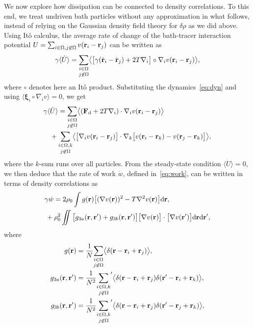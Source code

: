 \documentclass[pre, superscriptaddress, twocolumn,pre]{revtex4-1}
\newcommand{\dd}{\text{d}}
\begin{document}
We now explore how dissipation can be connected to density correlations. To this end, we treat undriven bath particles without any approximation in what follows, instead of relying on the Gaussian density field theory for $\delta\rho$ as we did above. Using It\^o calculus, the average rate of change of the bath-tracer interaction potential $U = \sum_{i\in\Omega,j\not\in\Omega} v({\bf r}_i-{\bf r}_j)$ can be written as
\begin{equation}
	\gamma\langle\dot U \rangle = \underset{j\not\in\Omega}{\sum_{i\in\Omega}} \big\langle\big[\gamma(\dot{\bf r}_i - \dot{\bf r}_j) + 2 T \nabla_i\big] \circ \nabla_i v({\bf r}_i-{\bf r}_j)\big\rangle ,
\end{equation}
where $\circ$ denotes here an It\^o product. Substituting the dynamics~\eqref{eq:dyn} and using $\langle{\boldsymbol\xi}_i\circ\nabla_i v\rangle=0$, we get
\begin{equation}\label{eq:dotU}
	\begin{aligned}
		\gamma\langle&\dot U \rangle = \underset{j\not\in\Omega}{\sum_{i\in\Omega}} \big\langle({\bf F}_{\rm d} + 2 T \nabla_i) \cdot \nabla_i v({\bf r}_i-{\bf r}_j)\big\rangle
		\\
		& + \underset{j\not\in\Omega}{\sum_{i\in\Omega,k}} \big\langle \big[\nabla_i v({\bf r}_i-{\bf r}_j)\big]\cdot \nabla_k \big[ v({\bf r}_i-{\bf r}_k) - v({\bf r}_j-{\bf r}_k) \big] \big\rangle ,
    \end{aligned}
\end{equation}
where the $k$-sum runs over all particles. From the steady-state condition $\langle\dot U \rangle=0$, we then deduce that the rate of work $\dot w$, defined in~\eqref{eq:work}, can be written in terms of density correlations as
\begin{equation}\label{eq:balance}
	\begin{aligned}
		&\gamma\dot w = 2\rho_0 \int g({\bf r}) \big[(\nabla v({\bf r}))^2 - T \nabla^2 v({\bf r})\big] \dd{\bf r} ,
		\\
		&\, + \rho_0^2 \iint\big[ g_{3a}({\bf r}, {\bf r}') + g_{3b}({\bf r}, {\bf r}')\big]  \big[\nabla v({\bf r})\big] \cdot \big[\nabla v({\bf r}')\big] \dd{\bf r} \dd{\bf r}' ,
	\end{aligned}
\end{equation}
where
\begin{equation}
	\begin{aligned}
 		g({\bf r}) &= \frac{1}{N} \underset{j\not\in\Omega}{\sum_{i\in\Omega}} \big\langle \delta({\bf r}-{\bf r}_i+{\bf r}_j)\big\rangle ,
		\\
 		g_{3a}({\bf r},{\bf r}') &= \frac{1}{N^2} \underset{j\not\in\Omega}{\sum_{i\in\Omega,k}}' \big\langle \delta({\bf r}-{\bf r}_i+{\bf r}_j) \delta({\bf r}'-{\bf r}_i+{\bf r}_k)\big\rangle ,
		\\
 		g_{3b}({\bf r},{\bf r}') &= \frac{1}{N^2} \underset{j\not\in\Omega}{\sum_{i\in\Omega,k}}' \big\langle \delta({\bf r}-{\bf r}_i+{\bf r}_j) \delta({\bf r}'-{\bf r}_j+{\bf r}_k)\big\rangle ,
	\end{aligned}
\end{equation}
\end{document}
